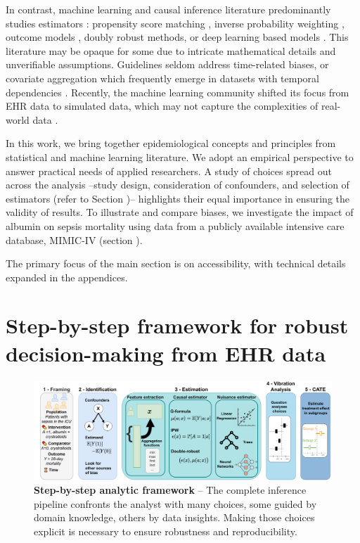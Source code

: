 \documentclass[10pt,letterpaper]{article}
\begin{document}
In contrast, machine learning and causal inference literature predominantly
studies estimators
\cite{belloni2014high,chernozhukov2018double,shalit2016tutorial,sharma2018tutorial,moraffah2021causal}
: propensity score matching \cite{stuart2010matching}, inverse probability
weighting \cite{austin2015moving}, outcome models \cite{robins1986role}, doubly
robust methods, \cite{chernozhukov2018double} or deep learning based models
\cite{johansson2022generalization}. This literature may be opaque for some due to intricate mathematical details and unverifiable assumptions. Guidelines seldom
address time-related biases, or covariate aggregation which
frequently emerge in datasets with temporal dependencies
\cite{suissa2008immortal,fu2021timing}. Recently, the machine learning community
shifted its focus from EHR data to simulated data, which may not capture the
complexities of real-world data \cite{schuler2017targeted,dorie2019automated,
  alaa2019validating, curth2021really}.

In this work, we bring together epidemiological concepts and
principles from statistical and machine learning literature. We adopt
an empirical perspective to answer practical needs of applied researchers.
A study of choices spread out across the analysis
--study design, consideration of
confounders, and selection of estimators (refer to Section
)-- highlights their equal importance in ensuring
the validity of results. To illustrate and compare biases, we investigate
the impact of albumin on sepsis mortality using data from a publicly available
intensive care database, MIMIC-IV \cite{johnson2020mimic} (section
).

The primary focus of the main section is on accessibility, with technical
details expanded in the appendices.

%
\section*{Step-by-step framework for robust decision-making from EHR data}\label{sec:inference_flow}

\begin{figure}[t!]
  \centering
  \includegraphics[width=0.9\linewidth]{img_main/complete_inference_flow.pdf}
  \caption{\textbf{Step-by-step analytic framework} -- The complete
    inference pipeline confronts the analyst with
    many choices, some guided by domain knowledge, others
    by data insights. Making those choices explicit is necessary to ensure
    robustness and reproducibility.}\label{fig:inference_framework}
\end{figure}
\end{document}
